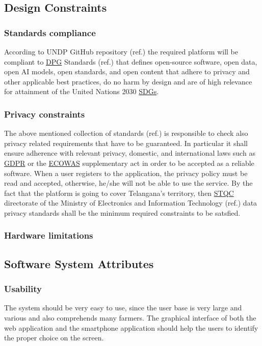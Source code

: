 \subsection{Design Constraints}

\subsubsection{Standards compliance}

According to UNDP GitHub repository (ref.\cite{UNDP_GitHub}) the required platform will be compliant to \hyperref[tab:acronymsTable]{DPG} Standards (ref.\cite{DPGS}) that defines open-source software, open data, open AI models, open standards, and open content that adhere to privacy and other applicable best practices, do no harm by design and are of high relevance for attainment of the United Nations 2030 \hyperref[tab:acronymsTable]{SDGs}.

\subsubsection{Privacy constraints}
The above mentioned collection of standards (ref.\cite{DPGS}) is responsible to check also privacy related requirements that have to be guaranteed. In particular it shall ensure adherence with relevant privacy, domestic, and international laws such as \hyperref[tab:acronymsTable]{GDPR} or the \hyperref[tab:acronymsTable]{ECOWAS} supplementary act  in order to be accepted as a reliable software. When a user registers to the application, the privacy policy must be read and accepted, otherwise, he/she will not be able to use the service. By the fact that the platform is going to cover Telangana's territory, then \hyperref[tab:acronymsTable]{STQC} directorate of the Ministry of Electronics and Information Technology (ref.\cite{DPGS}) data privacy standards shall be the minimum required constraints to be satsfied.




\subsubsection{Hardware limitations}

\subsection{Software System Attributes}
\subsubsection{Usability}
The system should be very easy to use, since the user base is very large and various and also comprehends many farmers. The graphical interface of both the web application and the smartphone application should help the users to identify the proper choice on the screen.
